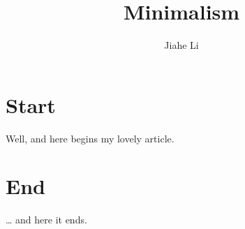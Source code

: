 \documentclass[a4paper,11pt]{article}
\author{Jiahe Li}
\title{Minimalism}
\begin{document}
\maketitle
\tableofcontents
\section{Start}
Well, and here begins my lovely article.
\section{End}
\ldots{} and here it ends.
\end{document}
